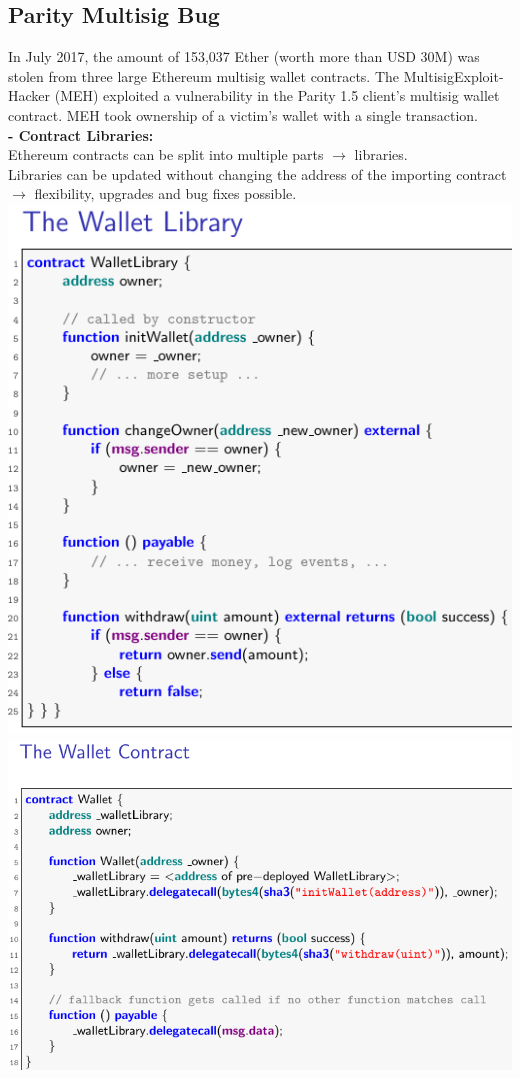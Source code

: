 \documentclass{article}
\begin{document}
\subsection{Parity Multisig Bug}
In July 2017, the amount of 153,037 Ether (worth more than USD 30M) was stolen from three large Ethereum multisig wallet contracts. The MultisigExploit-Hacker (MEH) exploited a vulnerability in the Parity 1.5 client's multisig wallet contract. MEH took ownership of a victim’s wallet with a single transaction.\\
\textbf{- Contract Libraries: }\\
Ethereum contracts can be split into multiple parts $\rightarrow$ libraries.\\
Libraries can be updated without changing the address of the importing contract $\rightarrow$ flexibility, upgrades and bug fixes possible.\\
\includegraphics[scale=0.3]{97.png}\\
\includegraphics[scale=0.3]{98.png}\\
\end{document}
